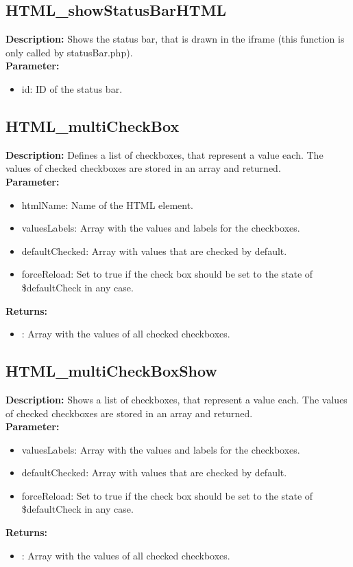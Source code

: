 \subsection{HTML\_showStatusBarHTML}
\textbf{Description:} Shows the status bar, that is drawn in the iframe (this function is only called by statusBar.php).\\
\textbf{Parameter:}
\begin{itemize}
\item id: ID of the status bar.
\end{itemize}

\subsection{HTML\_multiCheckBox}
\textbf{Description:} Defines a list of checkboxes, that represent a value each. The values of checked checkboxes are stored in an array and returned.\\
\textbf{Parameter:}
\begin{itemize}
\item htmlName: Name of the HTML element.
\item valuesLabels: Array with the values and labels for the checkboxes.
\item defaultChecked: Array with values that are checked by default.
\item forceReload: Set to true if the check box should be set to the state of \$defaultCheck in any case.
\end{itemize}
\textbf{Returns:}
\begin{itemize}
\item : Array with the values of all checked checkboxes.
\end{itemize}

\subsection{HTML\_multiCheckBoxShow}
\textbf{Description:} Shows a list of checkboxes, that represent a value each. The values of checked checkboxes are stored in an array and returned.\\
\textbf{Parameter:}
\begin{itemize}
\item valuesLabels: Array with the values and labels for the checkboxes.
\item defaultChecked: Array with values that are checked by default.
\item forceReload: Set to true if the check box should be set to the state of \$defaultCheck in any case.
\end{itemize}
\textbf{Returns:}
\begin{itemize}
\item : Array with the values of all checked checkboxes.
\end{itemize}

